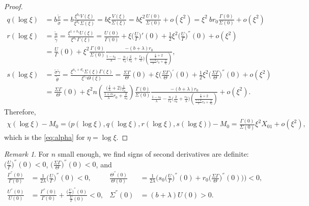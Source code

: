 \documentclass[a4paper,11pt]{article}
\def\tg{{\tilde{\gamma}}}
\def\tv{{\tilde{v}}}
\def\tth{{\tilde{\theta}}}
\def\ts{{\tilde{\sigma}}}
\def\tu{{\tilde{u}}}
\theoremstyle{remark}
\newtheorem{remark}{Remark}[section]
\begin{document}
\begin{proof}
\begin{align*}
 q(\log\xi) &= b\frac{\tv}{\ts} = b\frac{ \xi^{b_1} V(\xi) }{ \xi^{d_1} \Sigma(\xi)} = b\xi\frac{ V(\xi) }{ \Sigma(\xi)} = b\xi^2 \frac{U(0)}{\Sigma(0)}+ o(\xi^2)=\xi^2 ~br_0\frac{\Gamma(0)}{\Sigma(0)} + o(\xi^2) \\
 r(\log\xi) &= \frac{\tu}{ \tg } = \frac{ \xi^{1+b_1}U(\xi) }{ \xi^{a_1}\Gamma(\xi) } = \frac{ U(0) }{ \Gamma(0) }+ \xi \Big(\frac{U}{\Gamma}\Big)'(0) + \frac{1}{2}\xi^2\Big(\frac{U}{\Gamma}\Big)^{''}(0) + o(\xi^2)\\
  &=\frac{ U }{ \Gamma }(0) + \xi^2\frac{\Gamma(0)}{\Sigma(0)} \frac{-(b+\lambda)r_0}{\frac{1-s_0}{\lambda}-\frac{n}{r_0}\Big(\frac{2}{s_0} + \frac{r_0}{\lambda}\Big)\left(\frac{ \frac{1}{\lambda}+2}{ \frac{1+\alpha}{\lambda}r_0 + \frac{2}{s_0}}\right)} ,\\
 s(\log\xi) &= \frac{\ts\tg}{\tth} = \frac{ \xi^{a_1+d_1}\Sigma(\xi)\Gamma(\xi) }{\xi^{c_1} \Theta(\xi)} = \frac{ \Sigma\Gamma }{\Theta}(0) + \xi \Big(\frac{ \Sigma\Gamma }{\Theta}\Big)^{'}(0) + \frac{1}{2}\xi^2\Big(\frac{ \Sigma\Gamma }{\Theta}\Big)^{''}(0) + o(\xi^2)\\
 &=\frac{ \Sigma\Gamma }{\Theta}(0) + \xi^2 n \left(\frac{ \big(\frac{1}{\lambda}+2\big) \frac{1}{r_0} }{ \frac{1+\alpha}{\lambda}r_0 + \frac{2}{s_0}}\right)\frac{\Gamma(0)}{\Sigma(0)} \frac{-(b+\lambda)r_0}{\frac{1-s_0}{\lambda}-\frac{n}{r_0}\Big(\frac{2}{s_0} + \frac{r_0}{\lambda}\Big)\left(\frac{ \frac{1}{\lambda}+2}{ \frac{1+\alpha}{\lambda}r_0 + \frac{2}{s_0}}\right)}+ o(\xi^2).
\end{align*}
Therefore,
\begin{align*}
\chi(\log\xi)-M_0  = \big(p(\log\xi),q(\log\xi),r(\log\xi),s(\log\xi)\big) -M_0 =  \frac{\Gamma(0)}{\Sigma(0)}\xi^2 X_{01} + o(\xi^2),
\end{align*}
which is the \eqref{eq:alpha} for $\eta=\log\xi$.
\end{proof}
\begin{remark} \label{rem:signs}
For $n$ small enough, we find signs of second derivatives are definite: $\displaystyle \Big(\frac{U}{\Gamma}\Big)^{''}(0) <0$, $\displaystyle \Big(\frac{\Sigma\Gamma}{\Theta}\Big)^{''}(0) <0$, and
\begin{equation} \label{eq:second_der}
\begin{aligned}
\frac{\Gamma^{''}(0)}{\Gamma(0)} &= \frac{1}{2\lambda}\Big(\frac{U}{\Gamma}\Big)^{''}(0) < 0, &
\frac{\Theta^{''}(0)}{\Theta(0)} &= \frac{1}{2\lambda}\Big(s_0\Big(\frac{U}{\Gamma}\Big)^{''}(0) + r_0\Big(\frac{\Sigma\Gamma}{\Theta}\Big)^{''}(0)\Big)\Big)  < 0,\\
\frac{U^{''}(0)}{U(0)} &=\frac{\Gamma^{''}(0)}{\Gamma(0)} + \frac{ \big(\frac{U}{\Gamma}\big)^{''}(0)}{\frac{U}{\Gamma}(0)}< 0,&
\Sigma^{''}(0)&=(b+\lambda)U(0)>0.
\end{aligned}
\end{equation}
\end{remark}
\end{document}
